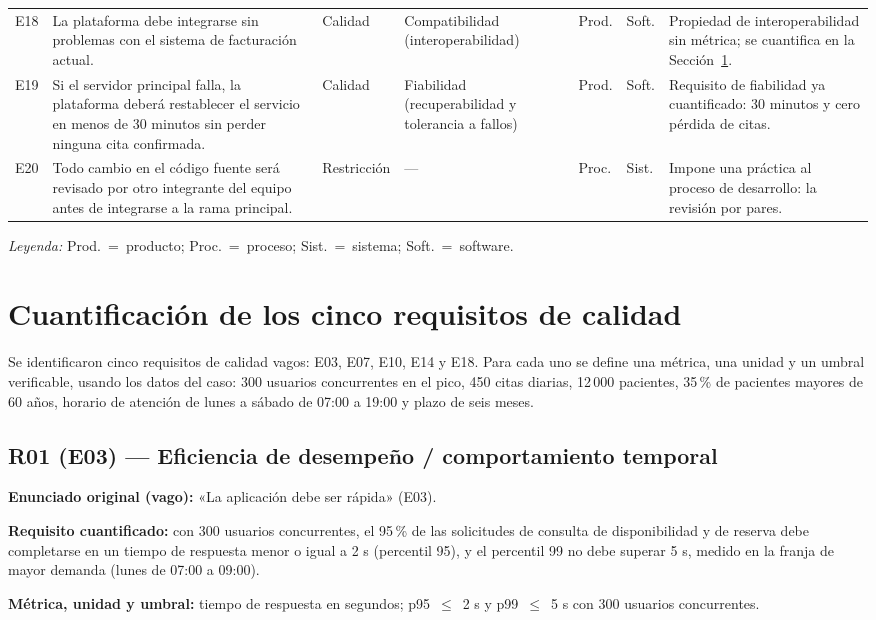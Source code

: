 \documentclass[11pt,a4paper]{article}
\begin{document}
\begin{longtable}{@{}p{0.85cm}p{4.35cm}p{1.8cm}p{2.45cm}p{1.15cm}p{1.15cm}p{3.3cm}@{}}
E18 & La plataforma debe integrarse sin problemas con el sistema de facturación actual. & Calidad & Compatibilidad (interoperabilidad) & Prod. & Soft. & Propiedad de interoperabilidad sin métrica; se cuantifica en la Sección~\ref{sec:cuant}. \\
E19 & Si el servidor principal falla, la plataforma deberá restablecer el servicio en menos de 30 minutos sin perder ninguna cita confirmada. & Calidad & Fiabilidad (recuperabilidad y tolerancia a fallos) & Prod. & Soft. & Requisito de fiabilidad ya cuantificado: 30 minutos y cero pérdida de citas. \\
E20 & Todo cambio en el código fuente será revisado por otro integrante del equipo antes de integrarse a la rama principal. & Restricción & --- & Proc. & Sist. & Impone una práctica al proceso de desarrollo: la revisión por pares. \\
\end{longtable}

\noindent\emph{Leyenda:} Prod.~=~producto; Proc.~=~proceso; Sist.~=~sistema; Soft.~=~software.

\section{Cuantificación de los cinco requisitos de calidad}\label{sec:cuant}

Se identificaron cinco requisitos de calidad vagos: E03, E07, E10, E14 y E18. Para cada uno se define una métrica, una unidad y un umbral verificable, usando los datos del caso: 300 usuarios concurrentes en el pico, 450 citas diarias, 12\,000 pacientes, 35\,\% de pacientes mayores de 60 años, horario de atención de lunes a sábado de 07:00 a 19:00 y plazo de seis meses.

\subsection{R01 (E03) --- Eficiencia de desempeño / comportamiento temporal}

\textbf{Enunciado original (vago):} «La aplicación debe ser rápida» (E03).

\textbf{Requisito cuantificado:} con 300 usuarios concurrentes, el 95\,\% de las solicitudes de consulta de disponibilidad y de reserva debe completarse en un tiempo de respuesta menor o igual a 2 s (percentil 95), y el percentil 99 no debe superar 5 s, medido en la franja de mayor demanda (lunes de 07:00 a 09:00).

\textbf{Métrica, unidad y umbral:} tiempo de respuesta en segundos; p95~$\leq$~2 s y p99~$\leq$~5 s con 300 usuarios concurrentes.
\end{document}
